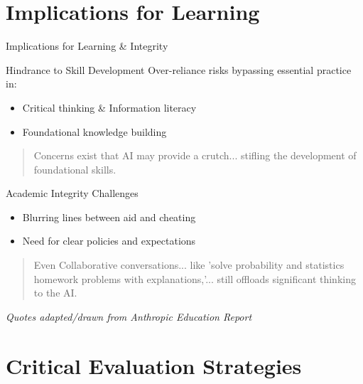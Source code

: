 \documentclass{beamer}
\begin{document}
\section{Implications for Learning}

\begin{frame}{Implications for Learning \& Integrity}
\begin{block}{Hindrance to Skill Development}
Over-reliance risks bypassing essential practice in:
\begin{itemize}
    \item Critical thinking \& Information literacy
    \item Foundational knowledge building
\end{itemize}
\blockquote{Concerns exist that AI may provide a crutch... stifling the development of foundational skills.}
\end{block}
\pause  %
\begin{block}{Academic Integrity Challenges}
\begin{itemize}
    \item Blurring lines between aid and cheating
    \item Need for clear policies and expectations
\end{itemize}
\blockquote{Even Collaborative conversations... like 'solve probability and statistics homework problems with explanations,'... still offloads significant thinking to the AI.}
\end{block}
\footnotesize{\textit{Quotes adapted/drawn from Anthropic Education Report}}
\end{frame}

\section{Critical Evaluation Strategies}
\end{document}
